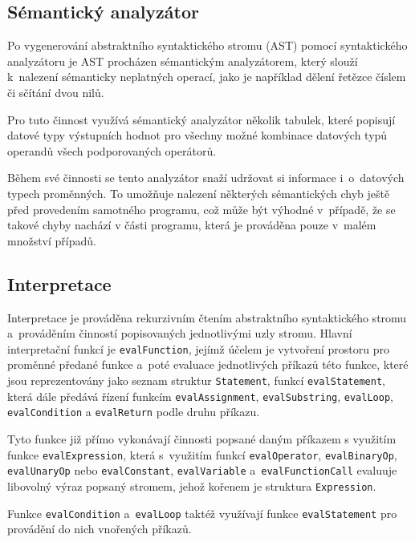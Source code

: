 \documentclass[12pt,a4paper,titlepage,final]{article}
\begin{document}
\subsection{Sémantický analyzátor}
Po vygenerování abstraktního syntaktického stromu (AST) pomocí syntaktického analyzátoru 
je AST procházen sémantickým analyzátorem, který slouží k~nalezení sémanticky 
neplatných operací, jako je například dělení řetězce číslem či sčítání dvou nilů.

Pro tuto činnost využívá sémantický analyzátor několik tabulek, které 
popisují datové typy výstupních hodnot pro všechny možné kombinace 
datových typů operandů všech podporovaných operátorů. 

Během své činnosti se tento analyzátor snaží udržovat si informace 
i~o~datových typech proměnných. To umožňuje nalezení některých sémantických 
chyb ještě před provedením samotného programu, což může být výhodné 
v~případě, že se takové chyby nachází v části programu, která je prováděna 
pouze v~malém množství případů.
\subsection{Interpretace}
Interpretace je prováděna rekurzivním čtením abstraktního syntaktického stromu 
a~prováděním činností popisovaných jednotlivými uzly stromu. 
Hlavní interpretační funkcí je \texttt{evalFunction}, jejímž účelem je 
vytvoření prostoru pro proměnné předané funkce a~poté evaluace jednotlivých 
příkazů této funkce, které jsou reprezentovány jako seznam struktur \texttt{Statement}, 
funkcí \texttt{evalStatement}, která dále předává řízení funkcím 
\texttt{evalAssignment}, \texttt{evalSubstring}, \texttt{evalLoop}, 
\texttt{evalCondition} a \texttt{evalReturn} podle druhu příkazu. 

Tyto funkce již přímo vykonávají činnosti popsané daným příkazem 
s využitím funkce \texttt{evalExpression}, která s~využitím funkcí \texttt{evalOperator}, 
\texttt{evalBinaryOp}, \texttt{evalUnaryOp} nebo \texttt{evalConstant}, \texttt{evalVariable} 
a~\texttt{evalFunctionCall} evaluuje libovolný výraz popsaný stromem, 
jehož kořenem je struktura \texttt{Expression}. 

Funkce \texttt{evalCondition} a~\texttt{evalLoop} taktéž využívají funkce 
\texttt{evalStatement} pro provádění do nich vnořených příkazů.

\end{document}
